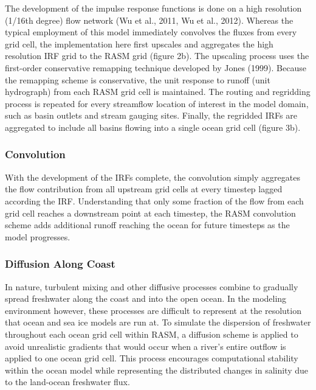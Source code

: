 The development of the impulse response functions is done on a high resolution (1/16th degree) flow network (Wu et al., 2011, Wu et al., 2012).  Whereas the typical employment of this model immediately convolves the fluxes from every grid cell, the implementation here first upscales and aggregates the high resolution IRF grid to the RASM grid (figure 2b). The upscaling process uses the first-order conservative remapping technique developed by Jones (1999). Because the remapping scheme is conservative, the unit response to runoff (unit hydrograph) from each RASM grid cell is maintained. The routing and regridding process is repeated for every streamflow location of interest in the model domain, such as basin outlets and stream gauging sites.  Finally, the regridded IRFs are aggregated to include all basins flowing into a single ocean grid cell (figure 3b).

\subsubsection{Convolution}

With the development of the IRFs complete, the convolution simply aggregates the flow contribution from all upstream grid cells at every timestep lagged according the IRF.  Understanding that only some fraction of the flow from each grid cell reaches a downstream point at each timestep, the RASM convolution scheme adds additional runoff reaching the ocean for future timesteps as the model progresses.

\subsubsection{Diffusion Along Coast}

In nature, turbulent mixing and other diffusive processes combine to gradually spread freshwater along the coast and into the open ocean.  In the modeling environment however, these processes are difficult to represent at the resolution that ocean and sea ice models are run at.  To simulate the dispersion of freshwater throughout each ocean grid cell within RASM, a diffusion scheme is applied to avoid unrealistic gradients that would occur when a river’s entire outflow is applied to one ocean grid cell.  This process encourages computational stability within the ocean model while representing the distributed changes in salinity due to the land-ocean freshwater flux.  